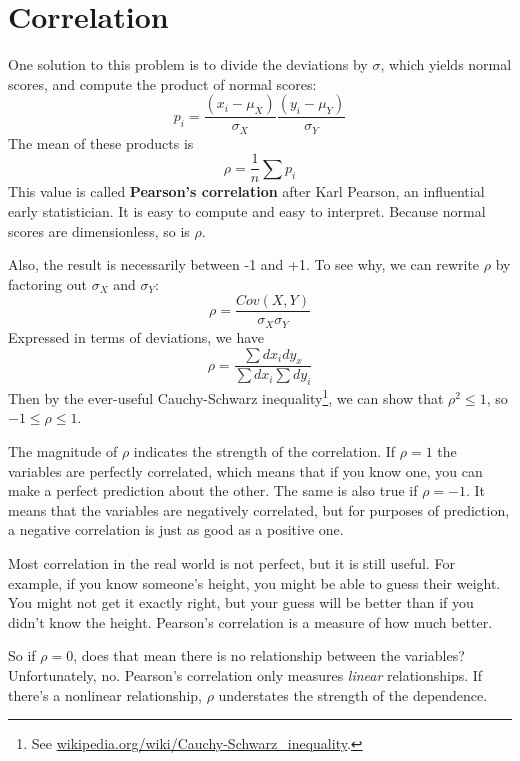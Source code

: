 \documentclass[12pt]{book}
\begin{document}
\section{Correlation}


One solution to this problem is to divide the deviations by $\sigma$,
which yields normal scores, and compute the product of normal scores:
%
\[ p_i = \frac{(x_i - \mu_X)}{\sigma_X} \frac{(y_i - \mu_Y)}{\sigma_Y} \]
%
The mean of these products is
%
\[ \rho = \frac{1}{n} \sum p_i \]
%
This value is called {\bf Pearson's correlation} after Karl Pearson,
an influential early statistician.  It is easy to compute and easy to
interpret.  Because normal scores are dimensionless, so is $\rho$.


Also, the result is necessarily between -1 and +1.  To see why, we
can rewrite $\rho$ by factoring out $\sigma_X$ and $\sigma_Y$:
%
\[ \rho = \frac{Cov(X,Y)}{\sigma_X \sigma_Y} \]
%
Expressed in terms of deviations, we have
%
\[ \rho = \frac{\sum dx_i dy_x}{\sum dx_i \sum dy_i} \]
%
Then by the ever-useful Cauchy-Schwarz inequality\footnote{See
  \url{wikipedia.org/wiki/Cauchy-Schwarz_inequality}.}, we can show
that $\rho^2 \le 1$, so $-1 \le \rho \le 1$.


The magnitude of $\rho$ indicates the strength of the correlation.  If
$\rho=1$ the variables are perfectly correlated, which means that if
you know one, you can make a perfect prediction about the other.  The
same is also true if $\rho=-1$.  It means that the variables
are negatively correlated, but for purposes of prediction, a
negative correlation is just as good as a positive one.


Most correlation in the real world is not perfect, but it
is still useful.  For example, if you know someone's height, you might
be able to guess their weight.  You might not get it exactly right, but
your guess will be better than if you didn't know the height.
Pearson's correlation is a measure of how much better.

So if $\rho=0$, does that mean there is no
relationship between the variables?  Unfortunately, no.  Pearson's
correlation only measures {\em linear} relationships.  If there's a
nonlinear relationship, $\rho$ understates the strength of the
dependence.
\end{document}
